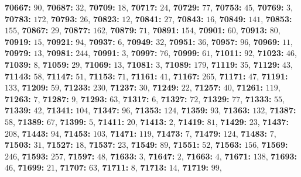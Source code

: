 \textsf{\bfseries 70667:} $90$, \textsf{\bfseries 70687:} $32$, \textsf{\bfseries 70709:} $18$, \textsf{\bfseries 70717:} $24$, \textsf{\bfseries 70729:} $77$, \textsf{\bfseries 70753:} $45$, \textsf{\bfseries 70769:} $3$, \textsf{\bfseries 70783:} $172$, \textsf{\bfseries 70793:} $26$, \textsf{\bfseries 70823:} $12$, \textsf{\bfseries 70841:} $27$, \textsf{\bfseries 70843:} $16$, \textsf{\bfseries 70849:} $141$, \textsf{\bfseries 70853:} $155$, \textsf{\bfseries 70867:} $29$, \textsf{\bfseries 70877:} $162$, \textsf{\bfseries 70879:} $71$, \textsf{\bfseries 70891:} $154$, \textsf{\bfseries 70901:} $60$, \textsf{\bfseries 70913:} $80$, \textsf{\bfseries 70919:} $15$, \textsf{\bfseries 70921:} $94$, \textsf{\bfseries 70937:} $6$, \textsf{\bfseries 70949:} $32$, \textsf{\bfseries 70951:} $36$, \textsf{\bfseries 70957:} $96$, \textsf{\bfseries 70969:} $11$, \textsf{\bfseries 70979:} $13$, \textsf{\bfseries 70981:} $244$, \textsf{\bfseries 70991:} $3$, \textsf{\bfseries 70997:} $76$, \textsf{\bfseries 70999:} $61$, \textsf{\bfseries 71011:} $92$, \textsf{\bfseries 71023:} $46$, \textsf{\bfseries 71039:} $8$, \textsf{\bfseries 71059:} $29$, \textsf{\bfseries 71069:} $13$, \textsf{\bfseries 71081:} $3$, \textsf{\bfseries 71089:} $179$, \textsf{\bfseries 71119:} $35$, \textsf{\bfseries 71129:} $43$, \textsf{\bfseries 71143:} $58$, \textsf{\bfseries 71147:} $51$, \textsf{\bfseries 71153:} $71$, \textsf{\bfseries 71161:} $41$, \textsf{\bfseries 71167:} $265$, \textsf{\bfseries 71171:} $47$, \textsf{\bfseries 71191:} $133$, \textsf{\bfseries 71209:} $59$, \textsf{\bfseries 71233:} $230$, \textsf{\bfseries 71237:} $30$, \textsf{\bfseries 71249:} $22$, \textsf{\bfseries 71257:} $40$, \textsf{\bfseries 71261:} $119$, \textsf{\bfseries 71263:} $7$, \textsf{\bfseries 71287:} $9$, \textsf{\bfseries 71293:} $63$, \textsf{\bfseries 71317:} $6$, \textsf{\bfseries 71327:} $72$, \textsf{\bfseries 71329:} $77$, \textsf{\bfseries 71333:} $55$, \textsf{\bfseries 71339:} $42$, \textsf{\bfseries 71341:} $104$, \textsf{\bfseries 71347:} $96$, \textsf{\bfseries 71353:} $124$, \textsf{\bfseries 71359:} $93$, \textsf{\bfseries 71363:} $132$, \textsf{\bfseries 71387:} $58$, \textsf{\bfseries 71389:} $67$, \textsf{\bfseries 71399:} $5$, \textsf{\bfseries 71411:} $20$, \textsf{\bfseries 71413:} $2$, \textsf{\bfseries 71419:} $81$, \textsf{\bfseries 71429:} $23$, \textsf{\bfseries 71437:} $208$, \textsf{\bfseries 71443:} $94$, \textsf{\bfseries 71453:} $103$, \textsf{\bfseries 71471:} $119$, \textsf{\bfseries 71473:} $7$, \textsf{\bfseries 71479:} $124$, \textsf{\bfseries 71483:} $7$, \textsf{\bfseries 71503:} $31$, \textsf{\bfseries 71527:} $18$, \textsf{\bfseries 71537:} $23$, \textsf{\bfseries 71549:} $89$, \textsf{\bfseries 71551:} $52$, \textsf{\bfseries 71563:} $156$, \textsf{\bfseries 71569:} $246$, \textsf{\bfseries 71593:} $257$, \textsf{\bfseries 71597:} $48$, \textsf{\bfseries 71633:} $3$, \textsf{\bfseries 71647:} $2$, \textsf{\bfseries 71663:} $4$, \textsf{\bfseries 71671:} $138$, \textsf{\bfseries 71693:} $46$, \textsf{\bfseries 71699:} $21$, \textsf{\bfseries 71707:} $63$, \textsf{\bfseries 71711:} $8$, \textsf{\bfseries 71713:} $14$, \textsf{\bfseries 71719:} $99$, 
